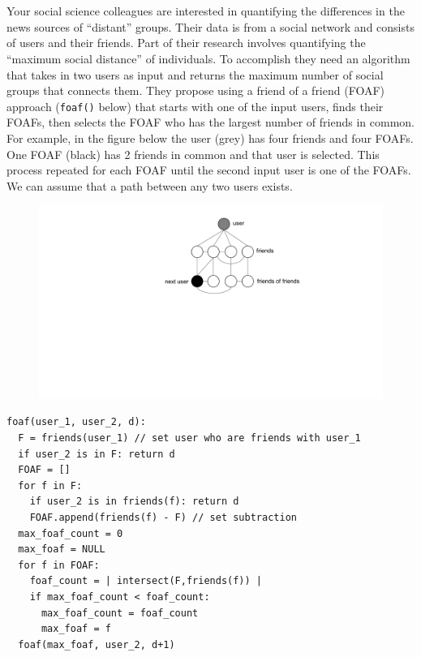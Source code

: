 \documentclass[12pt]{article}
\begin{document}
\renewcommand{\headrulewidth}{0.5pt}

\phantom{Test} \\ \\
Your social science colleagues are interested in quantifying the differences in
the news sources of ``distant'' groups. Their data is from a social network and
consists of users and their friends. Part of their research involves
quantifying the ``maximum social distance'' of individuals. To accomplish they
need an algorithm that takes in two users as input and returns the maximum
number of social groups that connects them. They propose using a friend of a
friend (FOAF) approach ({\tt foaf()} below) that starts with one of the input
users, finds their FOAFs, then selects the FOAF who has the largest number of
friends in common. For example, in the figure below the user (grey) has four
friends and four FOAFs. One FOAF (black) has 2 friends in common and that user
is selected.  This process repeated for each FOAF until the second input user
is one of the FOAFs. We can assume that a path between any two users exists.
\begin{figure}[h!]
\begin{center}
\includegraphics[scale=0.5]{EIB6_graph.pdf}
\end{center}
\end{figure}
\begin{small}
\begin{verbatim}
foaf(user_1, user_2, d):
  F = friends(user_1) // set user who are friends with user_1
  if user_2 is in F: return d
  FOAF = []
  for f in F:
    if user_2 is in friends(f): return d
    FOAF.append(friends(f) - F) // set subtraction
  max_foaf_count = 0
  max_foaf = NULL
  for f in FOAF:
    foaf_count = | intersect(F,friends(f)) |
    if max_foaf_count < foaf_count:
      max_foaf_count = foaf_count
      max_foaf = f
  foaf(max_foaf, user_2, d+1)
\end{verbatim}
\end{small}
\end{document}
